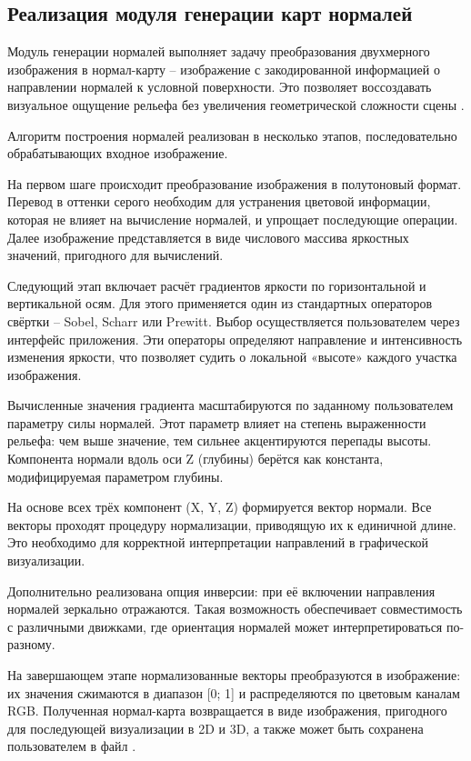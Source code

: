 \subsection{Реализация модуля генерации карт нормалей}

Модуль генерации нормалей выполняет задачу преобразования двухмерного изображения в нормал-карту -- изображение с закодированной информацией о направлении нормалей к условной поверхности. Это позволяет воссоздавать визуальное ощущение рельефа без увеличения геометрической сложности сцены \cite{russ2020}.

Алгоритм построения нормалей реализован в несколько этапов, последовательно обрабатывающих входное изображение.

На первом шаге происходит преобразование изображения в полутоновый формат. Перевод в оттенки серого необходим для устранения цветовой информации, которая не влияет на вычисление нормалей, и упрощает последующие операции. Далее изображение представляется в виде числового массива яркостных значений, пригодного для вычислений.

Следующий этап включает расчёт градиентов яркости по горизонтальной и вертикальной осям. Для этого применяется один из стандартных операторов свёртки -- Sobel, Scharr или Prewitt. Выбор осуществляется пользователем через интерфейс приложения. Эти операторы определяют направление и интенсивность изменения яркости, что позволяет судить о локальной «высоте» каждого участка изображения.

Вычисленные значения градиента масштабируются по заданному пользователем параметру силы нормалей. Этот параметр влияет на степень выраженности рельефа: чем выше значение, тем сильнее акцентируются перепады высоты. Компонента нормали вдоль оси Z (глубины) берётся как константа, модифицируемая параметром глубины.

На основе всех трёх компонент (X, Y, Z) формируется вектор нормали. Все векторы проходят процедуру нормализации, приводящую их к единичной длине. Это необходимо для корректной интерпретации направлений в графической визуализации.

Дополнительно реализована опция инверсии: при её включении направления нормалей зеркально отражаются. Такая возможность обеспечивает совместимость с различными движками, где ориентация нормалей может интерпретироваться по-разному.

На завершающем этапе нормализованные векторы преобразуются в изображение: их значения сжимаются в диапазон [0; 1] и распределяются по цветовым каналам RGB. Полученная нормал-карта возвращается в виде изображения, пригодного для последующей визуализации в 2D и 3D, а также может быть сохранена пользователем в файл \cite{day2021}.

